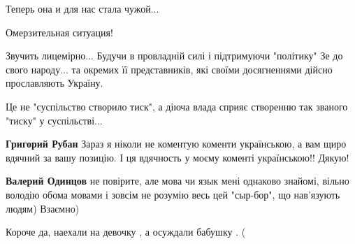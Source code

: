 \begin{itemize}
Теперь она и для нас стала чужой...

 
Омерзительная ситуация!

 

Звучить лицемірно... Будучи в провладній силі і підтримуючи "політику" Зе до
свого народу... та окремих її представників, які своїми досягненнями дійсно
прославляють Україну.

Це не "суспільство створило тиск", а діюча влада сприяє створенню так званого
"тиску" у суспільстві...

\begin{itemize}
 
\textbf{Григорий Рубан} Зараз я ніколи не коментую коменти українською, а вам щиро вдячний за вашу позицію. І ця вдячность у моєму коменті українською!! Дякую!

 
\textbf{Валерий Одинцов} не повірите, але мова чи язык мені однаково знайомі, вільно володію обома мовами і зовсім не розумію весь цей "сыр-бор", що нав'язують людям)
Взаємно)
\end{itemize}

 
Короче да, наехали на девочку , а осуждали бабушку . (


\end{itemize}

